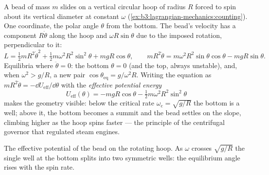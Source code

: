 \begin{example}\label{ex:b3:lagrangian-mechanics:hoop}
A bead of mass $m$ slides on a vertical circular hoop of radius $R$
forced to spin about its vertical diameter at constant $\omega$
(\cref{ex:b3:lagrangian-mechanics:counting}). One coordinate, the
polar angle $\theta$ from the bottom. The bead's velocity has a
component $R\dot\theta$ along the hoop and $\omega R\sin\theta$ due to
the imposed rotation, perpendicular to it:
\[
L = \tfrac12 mR^2\dot\theta^2 + \tfrac12 m\omega^2R^2\sin^2\theta
 + mgR\cos\theta ,
\qquad
mR^2\ddot\theta = m\omega^2R^2\sin\theta\cos\theta - mgR\sin\theta .
\]
Equilibria where $\ddot\theta = 0$: the bottom $\theta = 0$ (and the
top, always unstable), and, when $\omega^2 > g/R$, a new pair
$\cos\theta_{\text{eq}} = g/\omega^2R$. Writing the equation as
$mR^2\ddot\theta = -\dd U_{\text{eff}}/\dd\theta$ with the
\emph{effective potential energy}
\[
U_{\text{eff}}(\theta) = -mgR\cos\theta
 - \tfrac12 m\omega^2R^2\sin^2\theta
\]
makes the geometry visible: below the critical rate
$\omega_{\text{c}} = \sqrt{g/R}$ the bottom is a well; above it, the
bottom becomes a summit and the bead settles on the slope, climbing
higher as the hoop spins faster --- the principle of the centrifugal
governor that regulated steam engines.
\end{example}

\begin{omfigure}

{\small The effective potential of the bead on the rotating hoop. As
$\omega$ crosses $\sqrt{g/R}$ the single well at the bottom splits into
two symmetric wells: the equilibrium angle rises with the spin rate.}
\end{omfigure}

